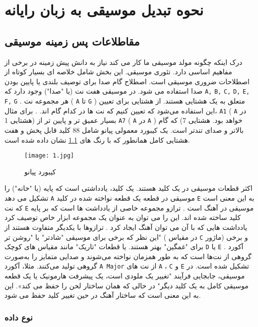 \chapter{نحوه تبدیل موسیقی به زبان رایانه}
\thispagestyle{empty}

\section{مقاطلاعات پس زمینه موسیقی}\label{ music}
درک اینکه چگونه مولد موسیقی ما کار می کند نیاز به دانش پیش زمینه در برخی از مفاهیم اساسی دارد. 
تئوری موسیقی. این بخش شامل خلاصه ای بسیار کوتاه از اصطلاحات ضروری موسیقی است. اصطلاح گام صدا 
برای توصیف بلندی یا پایین بودن صدا استفاده می شود.  در موسیقی هفت نت (یا "صدا") وجود دارد که 
\verb;A,;
\verb;B,; 
\verb;C,; 
\verb;D,; 
\verb;E,; 
\verb;F,; 
\verb;G;
. هر مجموعه نت
(
\verb;A;
تا 
\verb;G;
) متعلق به یک هشتایی
هستند. از هشتایی برای تعیین این استفاده می‌شود که تعیین کنیم که نت ها در کدام گام اند.  
. برای مثال، 
\verb;A1;
(
\verb;A;
در هشتایی 1)
بسیار عمیق تر و پایین تر از
\verb;A7;
(
\verb;A;
در 
\verb;A;
) 
خواهد بود.
هشتایی 7) که گام بالاتر و صدای تندتر است.  یک کیبورد معمولی پیانو شامل
88 کلید قابل پخش و هفت هشتایی کامل همانطور که با رنگ های 
\cref{fig.1}
نشان داده شده است.
\begin{figure}[!h]
\texttt{[image: 1.jpg]}
\caption{کیبورد پیانو}\label{fig.1}
\end{figure}
اکثر قطعات موسیقی در یک کلید هستند. یک کلید، یادداشتی است که پایه (یا "خانه") را تشکیل می دهد
\verb;A;
موسیقی در قطعه یک قطعه نواخته شده در کلید
\verb;E;
به این معنی است که نت
\verb;E;
موسیقی در آهنگ است .
ترازو مجموعه خاصی از یادداشت ها است که بر پایه کلید ساخته شده اند. این را می توان به عنوان یک مجموعه ابزار خاص توصیف کرد
یادداشت هایی که با آن می توان آهنگ ایجاد کرد . ترازوها با یکدیگر متفاوت هستند
از این نظر که برخی برای موسیقی "شادتر" یا "روشن تر" (
در مقیاس 
\verb;C;
ماژور) و برخی برای "غمگین" بهتر هستند.
یا قطعات "تاریک" مانند مقیاس های کوچک 
\verb;D;
یا
\verb;E;
. آکورد گروهی از نت‌ها است که به طور همزمان نواخته می‌شوند و صدایی متمایز را به‌صورت گروهی تولید می‌کنند. مثلا،
آکورد 
\verb;A Major; 
از نت های 
\verb;A;
،
\verb;C; 
و 
\verb;E; 
تشکیل شده است.  در موسیقی، جابجایی 
فرآیند "تغییر یک ملودی است،  یک پیشرفت هارمونیک یا یک قطعه موسیقی کامل به یک کلید دیگر"
در حالی که همان ساختار لحن را حفظ می کند». این به این معنی است که ساختار آهنگ 
در حین تغییر کلید حفظ می شود.
\subsection{نوع داده
}

